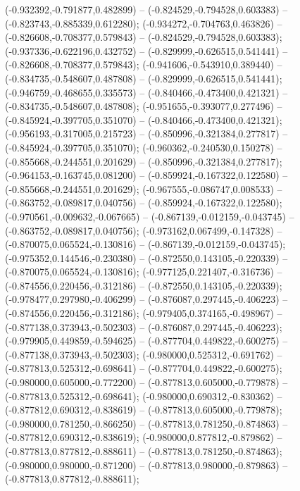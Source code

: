  (-0.932392,-0.791877,0.482899) -- (-0.824529,-0.794528,0.603383) -- (-0.823743,-0.885339,0.612280);
 (-0.934272,-0.704763,0.463826) -- (-0.826608,-0.708377,0.579843) -- (-0.824529,-0.794528,0.603383);
 (-0.937336,-0.622196,0.432752) -- (-0.829999,-0.626515,0.541441) -- (-0.826608,-0.708377,0.579843);
 (-0.941606,-0.543910,0.389440) -- (-0.834735,-0.548607,0.487808) -- (-0.829999,-0.626515,0.541441);
 (-0.946759,-0.468655,0.335573) -- (-0.840466,-0.473400,0.421321) -- (-0.834735,-0.548607,0.487808);
 (-0.951655,-0.393077,0.277496) -- (-0.845924,-0.397705,0.351070) -- (-0.840466,-0.473400,0.421321);
 (-0.956193,-0.317005,0.215723) -- (-0.850996,-0.321384,0.277817) -- (-0.845924,-0.397705,0.351070);
 (-0.960362,-0.240530,0.150278) -- (-0.855668,-0.244551,0.201629) -- (-0.850996,-0.321384,0.277817);
 (-0.964153,-0.163745,0.081200) -- (-0.859924,-0.167322,0.122580) -- (-0.855668,-0.244551,0.201629);
 (-0.967555,-0.086747,0.008533) -- (-0.863752,-0.089817,0.040756) -- (-0.859924,-0.167322,0.122580);
 (-0.970561,-0.009632,-0.067665) -- (-0.867139,-0.012159,-0.043745) -- (-0.863752,-0.089817,0.040756);
 (-0.973162,0.067499,-0.147328) -- (-0.870075,0.065524,-0.130816) -- (-0.867139,-0.012159,-0.043745);
 (-0.975352,0.144546,-0.230380) -- (-0.872550,0.143105,-0.220339) -- (-0.870075,0.065524,-0.130816);
 (-0.977125,0.221407,-0.316736) -- (-0.874556,0.220456,-0.312186) -- (-0.872550,0.143105,-0.220339);
 (-0.978477,0.297980,-0.406299) -- (-0.876087,0.297445,-0.406223) -- (-0.874556,0.220456,-0.312186);
 (-0.979405,0.374165,-0.498967) -- (-0.877138,0.373943,-0.502303) -- (-0.876087,0.297445,-0.406223);
 (-0.979905,0.449859,-0.594625) -- (-0.877704,0.449822,-0.600275) -- (-0.877138,0.373943,-0.502303);
 (-0.980000,0.525312,-0.691762) -- (-0.877813,0.525312,-0.698641) -- (-0.877704,0.449822,-0.600275);
 (-0.980000,0.605000,-0.772200) -- (-0.877813,0.605000,-0.779878) -- (-0.877813,0.525312,-0.698641);
 (-0.980000,0.690312,-0.830362) -- (-0.877812,0.690312,-0.838619) -- (-0.877813,0.605000,-0.779878);
 (-0.980000,0.781250,-0.866250) -- (-0.877813,0.781250,-0.874863) -- (-0.877812,0.690312,-0.838619);
 (-0.980000,0.877812,-0.879862) -- (-0.877813,0.877812,-0.888611) -- (-0.877813,0.781250,-0.874863);
 (-0.980000,0.980000,-0.871200) -- (-0.877813,0.980000,-0.879863) -- (-0.877813,0.877812,-0.888611);

